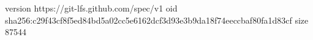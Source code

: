 version https://git-lfs.github.com/spec/v1
oid sha256:c29f43cf8f5ed84bd5a02cc5e6162dcf3d93e3b9da18f74eeccbaf80fa1d83cf
size 87544
